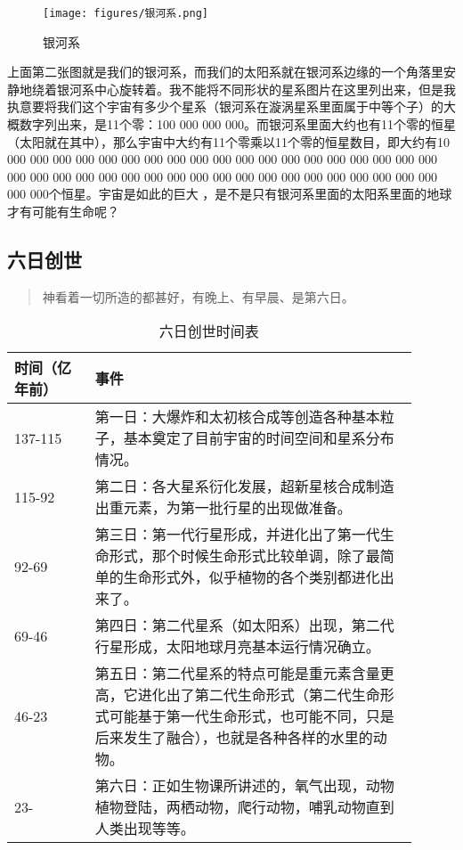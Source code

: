 \documentclass[11pt,oneside]{article}
\begin{document}
\begin{figure}[H]
\centering
\texttt{[image: figures/银河系.png]}
\caption{银河系}
\end{figure}

上面第二张图就是我们的银河系，而我们的太阳系就在银河系边缘的一个角落里安静地绕着银河系中心旋转着。我不能将不同形状的星系图片在这里列出来，但是我执意要将我们这个宇宙有多少个星系（银河系在漩涡星系里面属于中等个子）的大概数字列出来，是11个零：100 000 000 000。而银河系里面大约也有11个零的恒星（太阳就在其中），那么宇宙中大约有11个零乘以11个零的恒星数目，即大约有10 000 000 000 000 000 000 000 000 000 000 000 000 000 000 000 000 000 000 000 000 000 000 000 000 000 000 000 000 000 000 000 000 000 000 000 000 000 000 000 000个恒星。宇宙是如此的巨大 ，是不是只有银河系里面的太阳系里面的地球才有可能有生命呢？

\subsection{六日创世}
\label{sec-3-1}
\begin{quote}
神看着一切所造的都甚好，有晚上、有早晨、是第六日。 
\end{quote}


\begin{table}[H]
\caption{六日创世时间表}
\centering
\begin{tabular}{p{0.18\linewidth}|p{0.72\linewidth}}
\toprule
时间（亿年前） & 事件\\
\midrule
137-115 & 第一日：大爆炸和太初核合成等创造各种基本粒子，基本奠定了目前宇宙的时间空间和星系分布情况。\\
115-92 & 第二日：各大星系衍化发展，超新星核合成制造出重元素，为第一批行星的出现做准备。\\
92-69 & 第三日：第一代行星形成，并进化出了第一代生命形式，那个时候生命形式比较单调，除了最简单的生命形式外，似乎植物的各个类别都进化出来了。\\
69-46 & 第四日：第二代星系（如太阳系）出现，第二代行星形成，太阳地球月亮基本运行情况确立。\\
46-23 & 第五日：第二代星系的特点可能是重元素含量更高，它进化出了第二代生命形式（第二代生命形式可能基于第一代生命形式，也可能不同，只是后来发生了融合），也就是各种各样的水里的动物。\\
23- & 第六日：正如生物课所讲述的，氧气出现，动物植物登陆，两栖动物，爬行动物，哺乳动物直到人类出现等等。\\
\bottomrule
\end{tabular}
\end{table}
\end{document}
